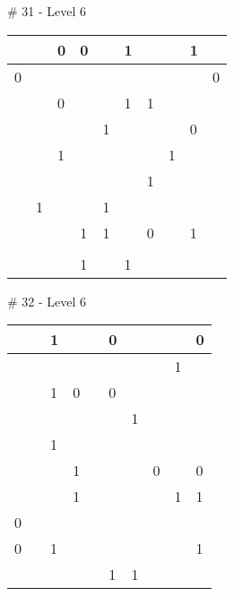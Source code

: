 \medskip

\# 31 - Level 6 \newline
\begin{tabular}{|m{\collen}|m{\collen}|m{\collen}|m{\collen}|m{\collen}|m{\collen}|m{\collen}|m{\collen}|m{\collen}|m{\collen}|}
\hline
    &   & 0 & 0 &   & 1 &   &   & 1 &   \\
\hline
  0 &   &   &   &   &   &   &   &   & 0 \\
\hline
    &   & 0 &   &   & 1 & 1 &   &   &   \\
\hline
    &   &   &   & 1 &   &   &   & 0 &   \\
\hline
    &   & 1 &   &   &   &   & 1 &   &   \\
\hline
    &   &   &   &   &   & 1 &   &   &   \\
\hline
    & 1 &   &   & 1 &   &   &   &   &   \\
\hline
    &   &   & 1 & 1 &   & 0 &   & 1 &   \\
\hline
    &   &   &   &   &   &   &   &   &   \\
\hline
    &   &   & 1 &   & 1 &   &   &   &   \\
\hline
\end{tabular}


\medskip

\# 32 - Level 6 \newline
\begin{tabular}{|m{\collen}|m{\collen}|m{\collen}|m{\collen}|m{\collen}|m{\collen}|m{\collen}|m{\collen}|m{\collen}|m{\collen}|}
\hline
    &   & 1 &   &   & 0 &   &   &   & 0 \\
\hline
    &   &   &   &   &   &   &   & 1 &   \\
\hline
    &   & 1 & 0 &   & 0 &   &   &   &   \\
\hline
    &   &   &   &   &   & 1 &   &   &   \\
\hline
    &   & 1 &   &   &   &   &   &   &   \\
\hline
    &   &   & 1 &   &   &   & 0 &   & 0 \\
\hline
    &   &   & 1 &   &   &   &   & 1 & 1 \\
\hline
  0 &   &   &   &   &   &   &   &   &   \\
\hline
  0 &   & 1 &   &   &   &   &   &   & 1 \\
\hline
    &   &   &   &   & 1 & 1 &   &   &   \\
\hline
\end{tabular}


\medskip

